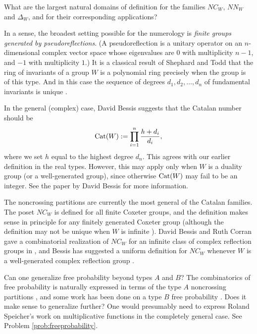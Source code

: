 \documentclass[12pt,letterpaper, reqno]{amsart}
\newcommand{\Cat}{{\rm Cat}}
\begin{document}
\begin{problemblock}

\begin{problem}\label{central:two} What are the largest natural domains of definition for the families $NC_W$, $NN_W$ and $\Delta_W$, and for their corresponding applications?\end{problem}

\begin{remark}
In a sense, the broadest setting possible for the numerology is {\em finite groups generated by pseudoreflections}. (A pseudoreflection is a unitary operator on an $n$-dimensional complex vector space whose eigenvalues are $0$ with multiplicity $n-1$, and $-1$ with multiplicity $1$.) It is a classical result of Shephard and Todd that the ring of invariants of a group $W$ is a polynomial ring precisely when the group is of this type. And in this case the sequence of degrees $d_1,d_2,\ldots,d_n$ of fundamental invariants is unique \cite{shephard-todd}.

In the general (complex) case, David Bessis suggests that the Catalan number should be
\begin{equation*}
\Cat(W):= \prod_{i=1}^n  \frac{h+d_i}{d_i},
\end{equation*}
where we set $h$ equal to the highest degree $d_n$. This agrees with our earlier definition in the real types. However, this may apply only when $W$ is a {\sf duality group} (or a {\sf well-generated group}), since otherwise $\Cat(W)$ may fail to be an integer. See the paper \cite{bessis:complex} by David Bessis for more information.
\end{remark}

\begin{remark}
The noncrossing partitions are currently the most general of the Catalan families. The poset $NC_W$ is defined for all finite Coxeter groups, and the definition makes sense in principle for any finitely generated Coxeter group (although the definition may not be unique when $W$ is infinite \cite{mccammond-etal}). David Bessis and Ruth Corran gave a combinatorial realization of $NC_W$ for an infinite class of complex reflection groups in \cite{bessis-corran}, and Bessis has suggested a uniform definition for $NC_W$ whenever $W$ is a well-generated complex reflection group \cite{bessis:complex}.
\end{remark}

\begin{remark}
Can one generalize free probability beyond types $A$ and $B$? The combinatorics of free probability is naturally expressed in terms of the type $A$ noncrossing partitions \cite{speicher:survey}, and some work has been done on a type $B$ free probability \cite{biane-goodman-nica}. Does it make sense to generalize further? One would presumably need to express Roland Speicher's work on multiplicative functions \cite{speicher} in the completely general case. See Problem \ref{prob:freeprobability}.
\end{remark}


\end{problemblock}
\end{document}

